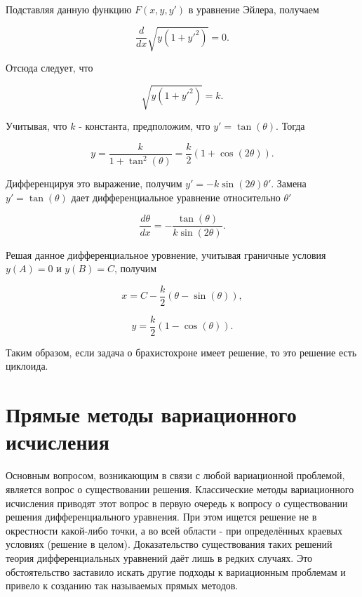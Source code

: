 \documentclass{article}
\begin{document}
Подставляя данную функцию $F(x, y, y')$ в уравнение Эйлера, получаем

\begin{displaymath}
	\frac{d}{dx} \sqrt{y (1+y'^2)} = 0.
\end{displaymath}

\noindent Отсюда следует, что

\begin{displaymath}
	\sqrt{y (1+y'^2)} = k.
\end{displaymath}

\noindent Учитывая, что $k$ - константа, предположим, что $y' = \tan(\theta)$. Тогда

\begin{displaymath}
	y = \frac{k}{1 + \tan^2(\theta)} = \frac{k}{2}(1 + \cos(2\theta)).
\end{displaymath}

\noindent Дифференцируя это выражение, получим $y' = -k \sin(2\theta) \theta'$. Замена $y' = \tan(\theta)$ дает дифференциальное уравнение относительно $\theta'$

\begin{displaymath}
	\frac{d \theta}{dx} = - \frac{\tan(\theta)}{k \sin(2\theta)}.
\end{displaymath}

\noindent Решая данное дифференциальное уровнение, учитывая граничные условия $y(A) = 0$ и $y(B) = C$, получим

\begin{displaymath}
	x = C - \frac{k}{2}(\theta - \sin(\theta)),
\end{displaymath}

\begin{displaymath}
	y = \frac{k}{2}(1 - \cos(\theta)).
\end{displaymath}

\noindent Таким образом, если задача о брахистохроне имеет решение, то это решение есть циклоида.


\newpage

\section{Прямые методы вариационного исчисления}

Основным вопросом, возникающим в связи с любой вариационной проблемой, является вопрос о существовании решения. Классические методы вариационного исчисления приводят этот вопрос в первую очередь к вопросу о существовании решения дифференциального уравнения. При этом ищется решение не в окрестности какой-либо точки, а во всей области - при определённых краевых условиях (решение в целом). Доказательство существования таких решений теория дифференциальных уравнений даёт лишь в редких случаях. Это обстоятельство заставило искать другие подходы к вариационным проблемам и привело к созданию так называемых прямых методов.
\end{document}
